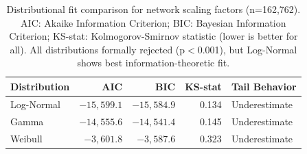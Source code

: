 \begin{table}[htbp]
\caption{Distributional fit comparison for network scaling factors (n=162,762). AIC: Akaike Information Criterion; BIC: Bayesian Information Criterion; KS-stat: Kolmogorov-Smirnov statistic (lower is better for all). All distributions formally rejected (p$<$0.001), but Log-Normal shows best information-theoretic fit.}
\label{tab:distributional_comparison}
\centering
\begin{tabular}{lrrrl}
\toprule
Distribution & AIC & BIC & KS-stat & Tail Behavior \\
\midrule
Log-Normal & $-15{,}599.1$ & $-15{,}584.9$ & 0.134 & Underestimate \\
Gamma & $-14{,}555.6$ & $-14{,}541.4$ & 0.145 & Underestimate \\
Weibull & $-3{,}601.8$ & $-3{,}587.6$ & 0.323 & Underestimate \\
\bottomrule
\end{tabular}
\end{table}
